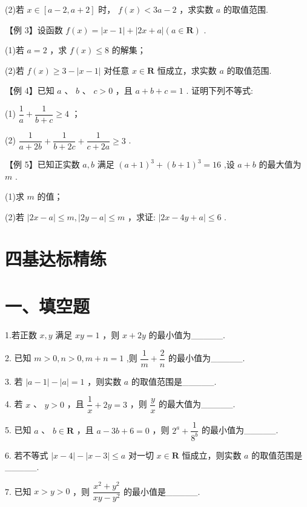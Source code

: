 (2)若 $x \in  \left\lbrack  {a - 2,a + 2}\right\rbrack$ 时， $f\left( x\right)  < {3a} - 2$ ，求实数 $a$ 的取值范围.

【例 3】设函数 $f\left( x\right)  = \left| {x - 1}\right|  + \left| {{2x} + a}\right| \left( {a \in  \mathbf{R}}\right)$ .

(1)若 $a = 2$ ，求 $f\left( x\right)  \leq  8$ 的解集；

(2)若 $f\left( x\right)  \geq  3 - \left| {x - 1}\right|$ 对任意 $x \in  \mathbf{R}$ 恒成立，求实数 $a$ 的取值范围.

【例 4】已知 $a$ 、 $b$ 、 $c > 0$ ，且 $a + b + c = 1$ . 证明下列不等式:

(1) $\dfrac{1}{a} + \dfrac{1}{b + c} \geq  4$ ；

(2) $\dfrac{1}{a + {2b}} + \dfrac{1}{b + {2c}} + \dfrac{1}{c + {2a}} \geq  3$ .

【例 5】已知正实数 $a,b$ 满足 ${\left( a + 1\right) }^{3} + {\left( b + 1\right) }^{3} = {16}$ ,设 $a + b$ 的最大值为 $m$ .

(1)求 $m$ 的值；

(2)若 $\left| {{2x} - a}\right|  \leq  m,\left| {{2y} - a}\right|  \leq  m$ ，求证: $\left| {{2x} - {4y} + a}\right|  \leq  6$ .

\section*{四基达标精练}

\section*{一、填空题}

1.若正数 $x,y$ 满足 ${xy} = 1$ ，则 $x + {2y}$ 的最小值为\_\_\_\_\_.

2. 已知 $m > 0,n > 0,m + n = 1$ ,则 $\dfrac{1}{m} + \dfrac{2}{n}$ 的最小值为\_\_\_\_\_.

3. 若 $\left| {a - 1}\right|  - \left| a\right|  = 1$ ，则实数 $a$ 的取值范围是\_\_\_\_\_.

4. 若 $x$ 、 $y > 0$ ，且 $\dfrac{1}{x} + {2y} = 3$ ，则 $\dfrac{y}{x}$ 的最大值为\_\_\_\_\_.

5. 已知 $a$ 、 $b \in  \mathbf{R}$ ，且 $a - {3b} + 6 = 0$ ，则 ${2}^{a} + \dfrac{1}{{8}^{b}}$ 的最小值为\_\_\_\_\_.

6. 若不等式 $\left| {x - 4}\right|  - \left| {x - 3}\right|  \leq  a$ 对一切 $x \in  \mathbf{R}$ 恒成立，则实数 $a$ 的取值范围是\_\_\_\_\_.

7. 已知 $x > y > 0$ ，则 $\dfrac{{x}^{2} + {y}^{2}}{{xy} - {y}^{2}}$ 的最小值是\_\_\_\_\_.

